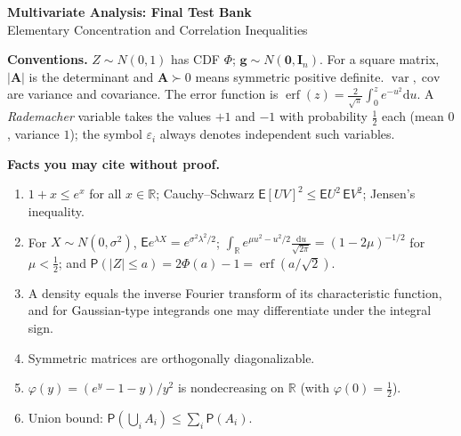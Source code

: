 \documentclass[12pt,a4paper]{article}
\theoremstyle{definition}
\newcommand\expc{\mathsf{E}}
\newcommand\prb{\mathsf{P}}
\DeclareMathOperator\var{var}
\DeclareMathOperator\cov{cov}
\DeclareMathOperator\erf{erf}
\newcommand{\dd}{\mathrm{d}}
\newcommand{\Real}{\mathbb{R}}
\newcommand{\bA}{\mathbf{A}}
\newcommand{\bI}{\mathbf{I}}
\newcommand{\bg}{\mathbf{g}}
\newcommand{\bzero}{\mathbf{0}}
\begin{document}
\vspace*{-8mm}
\begin{center}
  {\Large\bfseries Multivariate Analysis: Final Test Bank}\\[2pt]
  {\large Elementary Concentration and Correlation Inequalities}
\end{center}
\vspace{-1mm}

\noindent\textbf{Conventions.}\; $Z\sim N(0,1)$ has CDF $\Phi$; $\bg\sim N(\bzero,\bI_n)$. For a square matrix, $|\bA|$ is the determinant and $\bA\succ0$ means symmetric positive definite. $\var,\cov$ are variance and covariance. The error function is $\erf(z)=\tfrac{2}{\sqrt\pi}\int_0^z e^{-u^2}\dd u$. A \emph{Rademacher} variable takes the values $+1$ and $-1$ with probability $\tfrac12$ each (mean $0$, variance $1$); the symbol $\varepsilon_i$ always denotes independent such variables.

\noindent\textbf{Facts you may cite without proof.}
\begin{enumerate}[label=(F\arabic*),leftmargin=1.3cm,nosep]
\item\label{F:elem} $1+x\le e^x$ for all $x\in\Real$; Cauchy--Schwarz $\expc[UV]^2\le\expc U^2\,\expc V^2$; Jensen's inequality.
\item\label{F:gauss} For $X\sim N(0,\sigma^2)$, $\expc e^{\lambda X}=e^{\sigma^2\lambda^2/2}$; $\int_\Real e^{\mu u^2-u^2/2}\tfrac{\dd u}{\sqrt{2\pi}}=(1-2\mu)^{-1/2}$ for $\mu<\tfrac12$; and $\prb(|Z|\le a)=2\Phi(a)-1=\erf(a/\sqrt2)$.
\item\label{F:fourier} A density equals the inverse Fourier transform of its characteristic function, and for Gaussian-type integrands one may differentiate under the integral sign.
\item\label{F:la} Symmetric matrices are orthogonally diagonalizable.
\item\label{F:phi} $\varphi(y)=(e^y-1-y)/y^2$ is nondecreasing on $\Real$ (with $\varphi(0)=\tfrac12$).
\item\label{F:union} Union bound: $\prb(\bigcup_iA_i)\le\sum_i\prb(A_i)$.
\end{enumerate}
\end{document}
